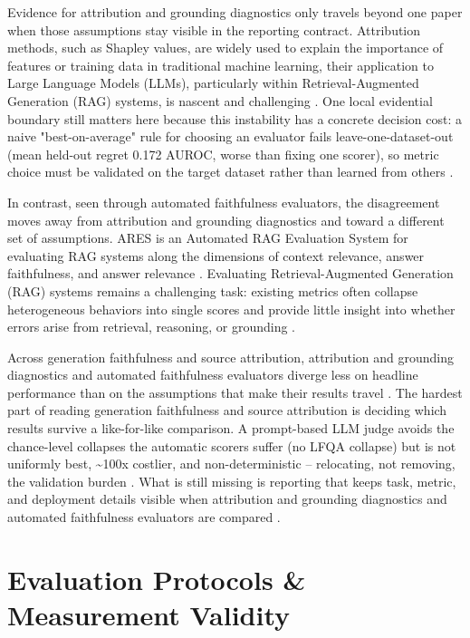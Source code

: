 \documentclass[a4paper,11pt]{article}
\begin{document}
Evidence for attribution and grounding diagnostics only travels beyond one paper when those assumptions stay visible in the reporting contract. Attribution methods, such as Shapley values, are widely used to explain the importance of features or training data in traditional machine learning, their application to Large Language Models (LLMs), particularly within Retrieval-Augmented Generation (RAG) systems, is nascent and challenging \citep{Nematov2025Source}. One local evidential boundary still matters here because this instability has a concrete decision cost: a naive "best-on-average" rule for choosing an evaluator fails leave-one-dataset-out (mean held-out regret 0.172 AUROC, worse than fixing one scorer), so metric choice must be validated on the target dataset rather than learned from others \citep{Ding2026Attribution}.

In contrast, seen through automated faithfulness evaluators, the disagreement moves away from attribution and grounding diagnostics and toward a different set of assumptions. ARES is an Automated RAG Evaluation System for evaluating RAG systems along the dimensions of context relevance, answer faithfulness, and answer relevance \citep{SaadFalcon2023Ares}. Evaluating Retrieval-Augmented Generation (RAG) systems remains a challenging task: existing metrics often collapse heterogeneous behaviors into single scores and provide little insight into whether errors arise from retrieval, reasoning, or grounding \citep{Murugaraj2025Ragvue}.

Across generation faithfulness and source attribution, attribution and grounding diagnostics and automated faithfulness evaluators diverge less on headline performance than on the assumptions that make their results travel \citep{Ding2026Attribution,Nematov2025Source,SaadFalcon2023Ares,Murugaraj2025Ragvue}. The hardest part of reading generation faithfulness and source attribution is deciding which results survive a like-for-like comparison. A prompt-based LLM judge avoids the chance-level collapses the automatic scorers suffer (no LFQA collapse) but is not uniformly best, \textasciitilde{}100x costlier, and non-deterministic -- relocating, not removing, the validation burden \citep{Ding2026Attribution}. What is still missing is reporting that keeps task, metric, and deployment details visible when attribution and grounding diagnostics and automated faithfulness evaluators are compared \citep{Caruzzo2026Deceptive,Ding2026Attribution}.
\section{Evaluation Protocols \& Measurement Validity}
\end{document}
